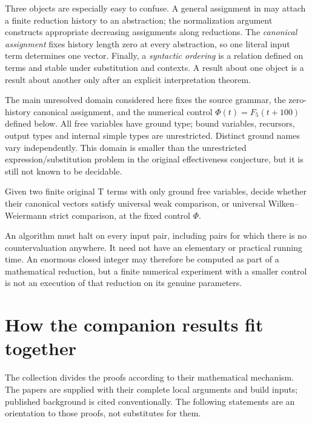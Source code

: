 \documentclass[11pt,a4paper]{article}
\begin{document}
Three objects are especially easy to confuse.  A general assignment in
\cite{ww} may attach a finite reduction history to an abstraction; the
normalization argument constructs appropriate decreasing assignments along
reductions.  The \emph{canonical assignment} fixes history length zero at
every abstraction, so one literal input term determines one vector.  Finally,
a \emph{syntactic ordering} is a relation defined on terms and stable under
substitution and contexts.  A result about one object is a result about
another only after an explicit interpretation theorem.

The main unresolved domain considered here fixes the source grammar,
the zero-history canonical assignment, and the numerical control
$\Phi(t)=F_5(t+100)$ defined below.  All free variables have ground type;
bound variables, recursors, output types and internal simple types are
unrestricted.  Distinct ground names vary independently.  This domain is
smaller than the unrestricted expression/substitution problem in the
original effectiveness conjecture, but it is still not known to be decidable.

\begin{problem}\label{prob:main}
Given two finite original T terms with only ground free variables, decide
whether their canonical vectors satisfy universal weak comparison, or
universal Wilken--Weiermann strict comparison, at the fixed control $\Phi$.
\end{problem}

An algorithm must halt on every input pair, including pairs for which there
is no countervaluation anywhere.  It need not have an elementary or practical
running time.  An enormous closed integer may therefore be computed as part
of a mathematical reduction, but a finite numerical experiment with a smaller
control is not an execution of that reduction on its genuine parameters.



\section{How the companion results fit together}\label{sec:companions}

The collection divides the proofs according to their mathematical mechanism.
The papers are supplied with their complete local arguments and build inputs;
published background is cited conventionally.  The following statements are
an orientation to those proofs, not substitutes for them.
\end{document}
